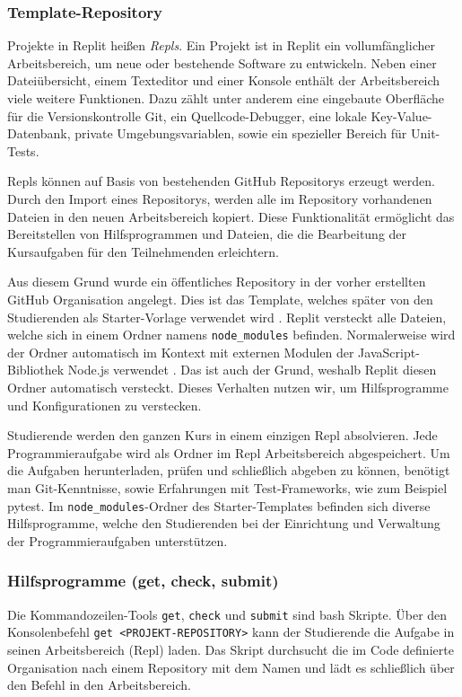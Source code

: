 \subsubsection{Template-Repository}\label{replit-template-repository}
Projekte in Replit heißen \emph{Repls}. Ein Projekt ist in Replit ein
vollumfänglicher Arbeitsbereich, um neue oder bestehende Software zu entwickeln.
Neben einer Dateiübersicht, einem Texteditor und einer Konsole enthält der
Arbeitsbereich viele weitere Funktionen. Dazu zählt unter anderem eine
eingebaute Oberfläche für die Versionskontrolle Git, ein Quellcode-Debugger,
eine lokale Key-Value-Datenbank, private Umgebungsvariablen, sowie ein
spezieller Bereich für Unit-Tests.

Repls können auf Basis von bestehenden GitHub Repositorys erzeugt werden. Durch
den Import eines Repositorys, werden alle im Repository vorhandenen Dateien
in den neuen Arbeitsbereich kopiert. Diese Funktionalität ermöglicht das
Bereitstellen von Hilfsprogrammen und Dateien, die die Bearbeitung der
Kursaufgaben für den Teilnehmenden erleichtern.

Aus diesem Grund wurde ein öffentliches Repository in der vorher erstellten
GitHub Organisation angelegt. Dies ist das Template, welches später von den
Studierenden als Starter-Vorlage verwendet wird
\parencite{git-repo:replit-template}. Replit versteckt alle Dateien, welche sich
in einem Ordner namens \texttt{node\_modules} befinden. Normalerweise wird der
Ordner automatisch im Kontext mit externen Modulen der JavaScript-Bibliothek
Node.js verwendet \parencite{nodejs}. Das ist auch der Grund, weshalb Replit
diesen Ordner automatisch versteckt. Dieses Verhalten nutzen wir, um
Hilfsprogramme und Konfigurationen zu verstecken.

Studierende werden den ganzen Kurs in einem einzigen Repl absolvieren. Jede
Programmieraufgabe wird als Ordner im Repl Arbeitsbereich abgespeichert. Um die
Aufgaben herunterladen, prüfen und schließlich abgeben zu können, benötigt man
Git-Kenntnisse, sowie Erfahrungen mit Test-Frameworks, wie zum Beispiel pytest.
Im \texttt{node\_modules}-Ordner des Starter-Templates befinden sich diverse
Hilfsprogramme, welche den Studierenden bei der Einrichtung und Verwaltung der
Programmieraufgaben unterstützen.

\subsubsection{Hilfsprogramme (get, check, submit)}
\label{replit-template-wrapper-tools}
Die Kommandozeilen-Tools \texttt{get}, \texttt{check} und \texttt{submit} sind
\ac{bash} Skripte. Über den Konsolenbefehl \texttt{get <PROJEKT-REPOSITORY>}
kann der Studierende die Aufgabe in seinen Arbeitsbereich (Repl) laden. Das
Skript durchsucht die im Code definierte Organisation nach einem Repository mit
dem Namen und lädt es schließlich über den Befehl  in den
Arbeitsbereich.

